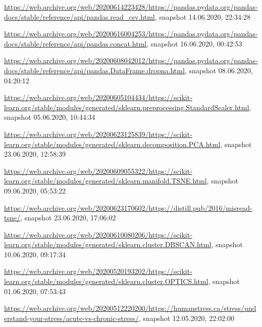 \begin{appendices}
\url{https://web.archive.org/web/20200614223428/https://pandas.pydata.org/pandas-docs/stable/reference/api/pandas.read_csv.html}, snapshot 14.06.2020, 22:34:28

\url{https://web.archive.org/web/20200616004253/https://pandas.pydata.org/pandas-docs/stable/reference/api/pandas.concat.html}, snapshot 16.06.2020, 00:42:53

\url{https://web.archive.org/web/20200608042012/https://pandas.pydata.org/pandas-docs/stable/reference/api/pandas.DataFrame.dropna.html}, snapshot 08.06.2020, 04:20:12

\url{https://web.archive.org/web/20200605104434/https://scikit-learn.org/stable/modules/generated/sklearn.preprocessing.StandardScaler.html}, snapshot 05.06.2020, 10:44:34

\url{https://web.archive.org/web/20200623125839/https://scikit-learn.org/stable/modules/generated/sklearn.decomposition.PCA.html}, snapshot 23.06.2020, 12:58:39

\url{https://web.archive.org/web/20200609055322/https://scikit-learn.org/stable/modules/generated/sklearn.manifold.TSNE.html}, snapshot 09.06.2020, 05:53:22

\url{https://web.archive.org/web/20200623170602/https://distill.pub/2016/misread-tsne/}, snapshot 23.06.2020, 17:06:02

\url{https://web.archive.org/web/20200610080206/https://scikit-learn.org/stable/modules/generated/sklearn.cluster.DBSCAN.html}, snapshot 10.06.2020, 09:17:34

\url{https://web.archive.org/web/20200520193202/https://scikit-learn.org/stable/modules/generated/sklearn.cluster.OPTICS.html}, snapshot 01.06.2020, 07:53:43

\url{https://web.archive.org/web/20200512220200/https://humanstress.ca/stress/understand-your-stress/acute-vs-chronic-stress/}, snapshot 12.05.2020, 22:02:00



\end{appendices}
